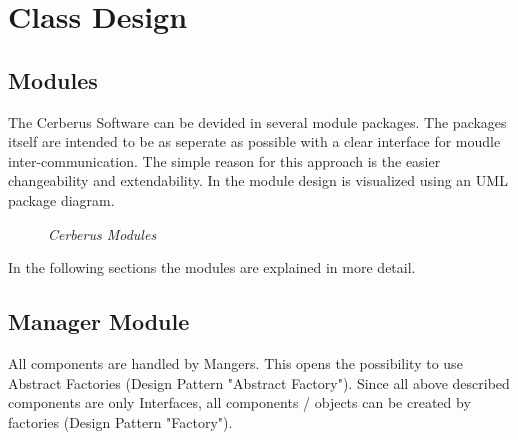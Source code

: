 \chapter{Class Design}

\section{Modules}

The Cerberus Software can be devided in several module packages.
The packages itself are intended to be as seperate as possible with a clear interface for moudle inter-communication. 
The simple reason for this approach is the easier changeability and extendability.
In  the module design is visualized using an UML package diagram.

\begin{figure}[ht]
\centering
{} 
\caption[Cerberus Module Design]{\textit{Cerberus Modules}} 
\label{gfx:cerberus_module_design}
\end{figure}

In the following sections the modules are explained in more detail.

\section{Manager Module}

All components are handled by Mangers. This opens the possibility to use Abstract Factories (Design Pattern "Abstract  Factory"). Since all above described components are only Interfaces, all components / objects can be created by factories (Design Pattern "Factory").

